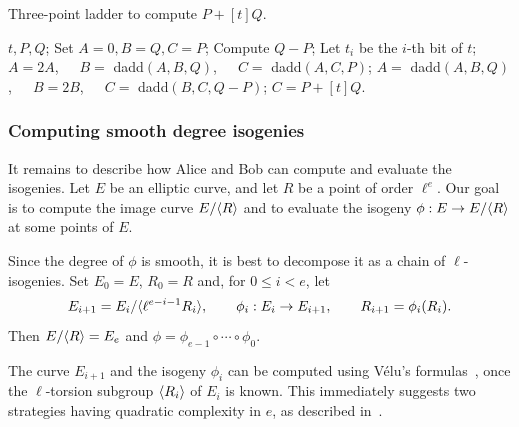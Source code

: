 \begin{algorithm}[t]
  \caption{Three-point ladder to compute $P+[t]Q$.}
  \label{fig:ladder}
  \begin{algorithmic}[1]
    \REQUIRE $t,P,Q$;
    \STATE Set $A=0,B=Q,C=P$;
    \STATE Compute $Q-P$;
    \STATE Let $t_i$ be the $i$-th bit of $t$;
    \STATE $A=2A$,~~~$B=$ dadd$(A,B,Q)$,~~~$C=$ dadd$(A,C,P)$;
    \ELSE
    \STATE $A=$ dadd$(A,B,Q)$,~~~$B=2B$,~~~$C=$ dadd$(B,C,Q-P)$;
    \ENDIF
    \ENDFOR
    \ENSURE $C=P+[t]Q$.
  \end{algorithmic}
\end{algorithm}


\subsubsection{Computing smooth degree isogenies}\label{sssec:isogeny}


It remains to describe how Alice and Bob can compute and evaluate the
isogenies. Let $E$ be an elliptic curve, and let $R$ be a point of
order $\ell^e$. Our goal is to compute the image curve $E/{\langle R \rangle}$ and
to evaluate the isogeny $\phi:E\to E/{\langle R \rangle}$ at some points of $E$.

Since the degree of $\phi$ is smooth, it is best to decompose it as a
chain of $\ell$-isogenies. Set $E_0=E$, $R_0=R$ and, for $0\le i <e$,
let
\begin{equation*}
  E_{i+1} = E_i/{\langle \ell^{e-i-1}R_i \rangle},\qquad
  \phi_i : E_i \to E_{i+1},\qquad
  R_{i+1} = \phi_i(R_i).
\end{equation*}
Then $E/{\langle R \rangle} = E_e$ and $\phi=\phi_{e-1}\circ\cdots\circ\phi_0$.

The curve $E_{i+1}$ and the isogeny $\phi_i$ can be computed using
V\'elu's formulas~\cite{Velu}, once the $\ell$-torsion
subgroup ${\langle R_i \rangle}$ of $E_i$ is known. This immediately suggests two strategies
having quadratic complexity in $e$, as described
in~\cite{pqcrypto}.

